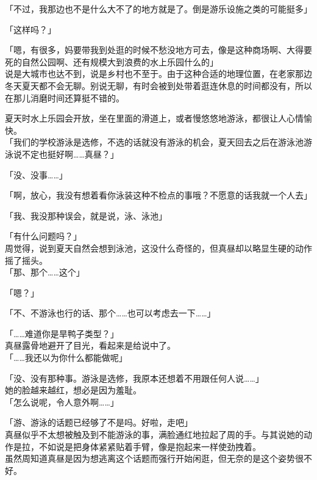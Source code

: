 「不过，我那边也不是什么大不了的地方就是了。倒是游乐设施之类的可能挺多」

「这样吗？」

「嗯，有很多，妈要带我到处逛的时候不愁没地方可去，像是这种商场啊、大得要死的自然公园啊、还有规模大到浪费的水上乐园什么的」\\

说是大城市也达不到，说是乡村也不至于。由于这种合适的地理位置，在老家那边冬天夏天都不会无聊。别说无聊，有时会被到处带着逛连休息的时间都没有，所以在那儿消磨时间还算挺不错的。

夏天时水上乐园会开放，坐在里面的滑道上，或者慢悠悠地游泳，都很让人心情愉快。\\

「我们的学校游泳是选修，不选的话就没有游泳的机会，夏天回去之后在游泳池游泳说不定也挺好啊……真昼？」

「没、没事……」

「啊，放心，我没有想着看你泳装这种不检点的事哦？不愿意的话我就一个人去」

「我、我没那种误会，就是说，泳、泳池」

「有什么问题吗？」\\

周觉得，说到夏天自然会想到泳池，这没什么奇怪的，但真昼却以略显生硬的动作摇了摇头。\\

「那、那个……这个」

「嗯？」

「不、不游泳也行的话、那个……也可以考虑去一下……」

「……难道你是旱鸭子类型？」\\

真昼露骨地避开了目光，看起来是给说中了。\\

「……我还以为你什么都能做呢」

「没、没有那种事。游泳是选修，我原本还想着不用跟任何人说……」\\

她的脸越来越红，想必是因为羞耻。\\

「怎么说呢，令人意外啊……」

「游、游泳的话题已经够了不是吗。好啦，走吧」\\

真昼似乎不太想被触及到不能游泳的事，满脸通红地拉起了周的手。与其说她的动作是拉，不如说是把身体紧紧贴着手臂，像是抱起来一样使劲拽着。\\

虽然周知道真昼是因为想逃离这个话题而强行开始闲逛，但无奈的是这个姿势很不好。\\

